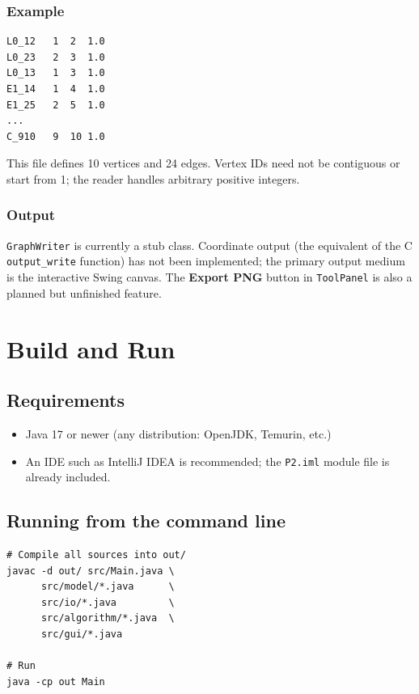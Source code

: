 \documentclass[12pt,a4paper]{article}
\begin{document}
\subsubsection*{Example}

\begin{lstlisting}[style=plain,caption={test.txt --- a Petersen-like graph}]
L0_12   1  2  1.0
L0_23   2  3  1.0
L0_13   1  3  1.0
E1_14   1  4  1.0
E1_25   2  5  1.0
...
C_910   9  10 1.0
\end{lstlisting}

This file defines 10 vertices and 24 edges. Vertex IDs need not be
contiguous or start from 1; the reader handles arbitrary positive integers.

\subsubsection*{Output}

\texttt{GraphWriter} is currently a stub class. Coordinate output (the
equivalent of the C \texttt{output\_write} function) has not been
implemented; the primary output medium is the interactive Swing canvas.
The \textbf{Export PNG} button in \texttt{ToolPanel} is also a planned
but unfinished feature.

\section{Build and Run}

\subsection{Requirements}

\begin{itemize}
  \item Java 17 or newer (any distribution: OpenJDK, Temurin, etc.)
  \item An IDE such as IntelliJ IDEA is recommended; the \texttt{P2.iml}
        module file is already included.
\end{itemize}

\subsection{Running from the command line}

\begin{lstlisting}[style=bash,caption={Compile and run from project root}]
# Compile all sources into out/
javac -d out/ src/Main.java \
      src/model/*.java      \
      src/io/*.java         \
      src/algorithm/*.java  \
      src/gui/*.java

# Run
java -cp out Main
\end{lstlisting}
\end{document}
